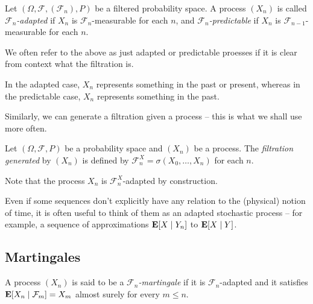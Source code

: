 \begin{definition}
	Let $(\Omega,\mathcal{F},(\mathcal{F}_n),P)$ be a filtered probability space. A process $(X_n)$ is called \textit{$\mathcal{F}_n$-adapted} if $X_n$ is $\mathcal{F}_n$-measurable for each $n$, and \textit{$\mathcal{F}_n$-predictable} if $X_n$ is $\mathcal{F}_{n-1}$-measurable for each $n$.
\end{definition}

We often refer to the above as just adapted or predictable proesses if it is clear from context what the filtration is.

In the adapted case, $X_n$ represents something in the past or present, whereas in the predictable case, $X_n$ represents something in the past.

Similarly, we can generate a filtration given a process -- this is what we shall use more often.

\begin{definition}
	Let $(\Omega,\mathcal{F},P)$ be a probability space and $(X_n)$ be a process. The \textit{filtration generated} by $(X_n)$ is defined by $\mathcal{F}_n^X=\sigma(X_0,\ldots,X_n)$ for each $n$.
\end{definition}
Note that the process $X_n$ is $\mathcal{F}_n^X$-adapted by construction.

Even if some sequences don't explicitly have any relation to the (physical) notion of time, it is often useful to think of them as an adapted stochastic process -- for example, a sequence of approximations $\textbf{E}[X\mid Y_n]$ to $\textbf{E}[X\mid Y]$.

\subsection{Martingales}

\begin{fdef}
	A process $(X_n)$ is said to be a \textit{$\mathcal{F}_n$-martingale} if it is $\mathcal{F}_n$-adapted and it satisfies $\textbf{E}[X_n\mid\mathcal{F}_m] = X_m$ almost surely for every $m\leq n$.
\end{fdef}

